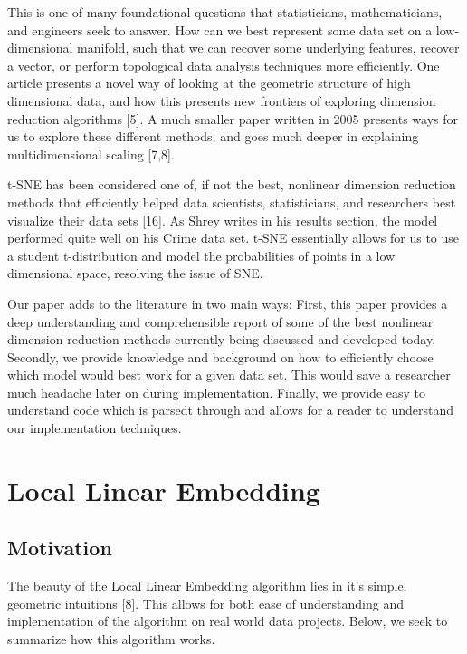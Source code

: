 \documentclass[11pt]{article}
\begin{document}
This is one of many foundational questions that statisticians, mathematicians, and engineers seek to answer. How can we best represent some data set on a low-dimensional manifold, such that we can recover some underlying features, recover a vector, or perform topological data analysis techniques more efficiently. One article presents a novel way of looking at the geometric structure of high dimensional data, and how this presents new frontiers of exploring dimension reduction algorithms [5]. A much smaller paper written in 2005 presents ways for us to explore these different methods, and goes much deeper in explaining multidimensional scaling [7,8].

t-SNE has been considered one of, if not the best, nonlinear dimension reduction methods that efficiently helped data scientists, statisticians, and researchers best visualize their data sets [16]. As Shrey writes in his results section, the model performed quite well on his Crime data set. t-SNE essentially allows for us to use a student t-distribution and model the probabilities of points in a low dimensional space, resolving the issue of SNE. 

Our paper adds to the literature in two main ways: First, this paper provides a deep understanding and comprehensible report of some of the best nonlinear dimension reduction methods currently being discussed and developed today. Secondly, we provide knowledge and background on how to efficiently choose which model would best work for a given data set. This would save a researcher much headache later on during implementation. Finally, we provide easy to understand code which is parsedt through and allows for a reader to understand our implementation techniques.

\section{Local Linear Embedding} \label{sec:Local Linear Embedding}

\subsection{Motivation}
\hspace{5mm}
The beauty of the Local Linear Embedding algorithm lies in it's simple, geometric intuitions [8]. This allows for both ease of understanding and implementation of the algorithm on real world data projects. Below, we seek to summarize how this algorithm works.
\end{document}
